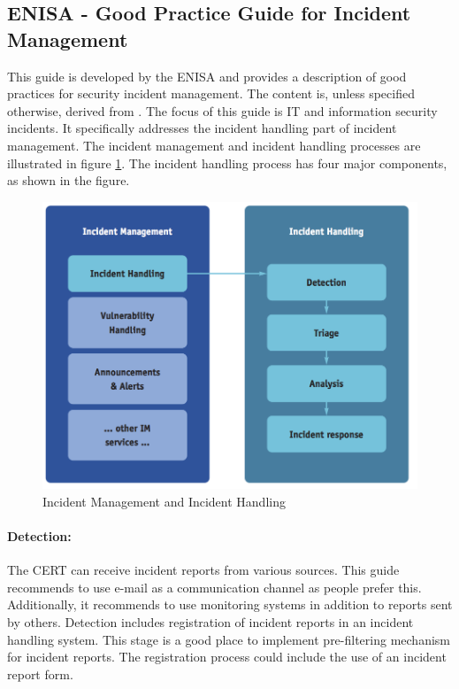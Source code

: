 \subsection{\acs{ENISA} - Good Practice Guide for Incident Management}
This guide is developed by the \ac{ENISA} and provides a description of good practices for security incident management. The content is, unless specified otherwise, derived from \cite{enisaGuide}. The focus of this guide is IT and information security incidents. It specifically addresses the incident handling part of incident management. The incident management and incident handling processes are illustrated in figure \ref{fig:ENISAIncidentManagement}. The incident handling process has four major components, as shown in the figure. 

\begin{figure}[h]
\begin{center}
\includegraphics[scale=0.74]{enisaIncidentManagement.png}
\caption[ENISA Incident Management and Incident Handling]{Incident Management and Incident Handling \cite{enisaGuide}}
\label{fig:ENISAIncidentManagement}
\end{center}
\end{figure}

\paragraph{Detection:} The \ac{CERT} can receive incident reports from various sources. This guide recommends to use e-mail as a communication channel as people prefer this. Additionally, it recommends to use monitoring systems in addition to reports sent by others. Detection includes registration of incident reports in an incident handling system. This stage is a good place to implement pre-filtering mechanism for incident reports. The registration process could include the use of an incident report form.

